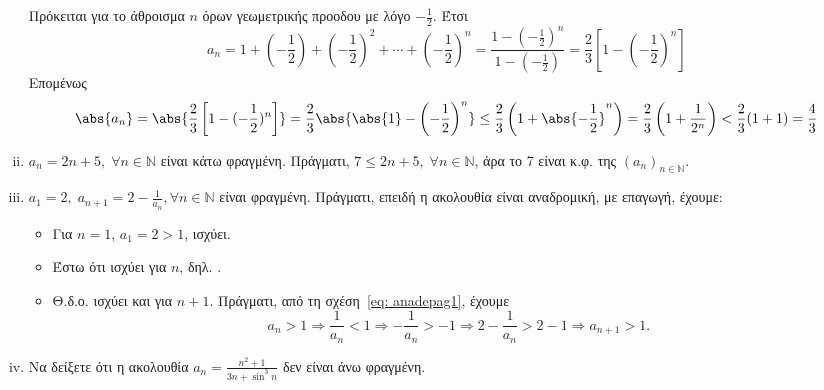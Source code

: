 \documentclass[main.tex]{subfiles}
\begin{document}
\begin{examples}
\begin{enumerate}[i)]
            Πρόκειται για το άθροισμα $ n $ όρων γεωμετρικής προοδου με 
            λόγο $ -\frac{1}{2} $. Έτσι
            \[ a_{n} = 1 + \left(- \frac{1}{2}\right) + \left(- \frac{1}{2} 
                \right)^{2} + \cdots + \left(- \frac{1}{2} \right)^{n} = 
                \frac{1 - (- \frac{1}{2} )^{n}}{1 - (- \frac{1}{2})} = 
            \frac{2}{3} \left[1 - \left(- \frac{1}{2} \right)^{n}\right] \]
            Επομένως
            \[
                \abs{a_{n}} = \abs{\frac{2}{3} \left[1-(- \frac{1}{2} )^{n}
                        \right]} = \frac{2}{3} \abs{\abs{1} - \left(- 
                \frac{1}{2}\right)^{n}} \leq 
                \frac{2}{3} \left(1 + \abs{-\frac{1}{2} }^{n} \right) = 
                \frac{2}{3} \left(1+ \frac{1}{2^{n}}\right) < \frac{2}{3}
                (1+1) = \frac{4}{3} 
            \] 

        \item $ a_{n}= 2n+5, \; \forall n \in \mathbb{N} $ είναι κάτω 
            φραγμένη.
            Πράγματι, $ 7 \leq 2n+5, \; \forall n \in \mathbb{N} $, άρα το 
            7 είναι κ.φ. της $ (a_{n} )_{n \in \mathbb{N}} $.

        \item $ a_{1}=2, \; a_{n+1}=2 - \frac{1}{a_{n}}, \forall n \in 
            \mathbb{N}$
            είναι φραγμένη. Πράγματι, επειδή η ακολουθία είναι αναδρομική, 
            με επαγωγή, έχουμε:
            \begin{itemize}
                \item Για $ n=1 $, $ a_{1}=2>1 $, ισχύει. 
                \item Έστω ότι ισχύει για $n$, δηλ. .
                \item Θ.δ.ο. ισχύει και για $ n+1 $. Πράγματι, από τη 
                    σχέση~\eqref{eq: anadepag1}, έχουμε
                    \[
                        a_{n}>1 \Rightarrow \frac{1}{a_{n}} 
                        < 1 \Rightarrow - \frac{1}{a_{n}} > 
                        -1 \Rightarrow 2 - \frac{1}{a_{n}} 
                        > 2-1 \Rightarrow a_{n+1} > 1.
                    \] 
            \end{itemize}

            \item Να δείξετε ότι η ακολουθία $ a_{n} = 
                \frac{n^{2}+1}{3n+ \sin^{3}{n}} $ δεν είναι άνω φραγμένη.


\end{enumerate}
\end{examples}
\end{document}
